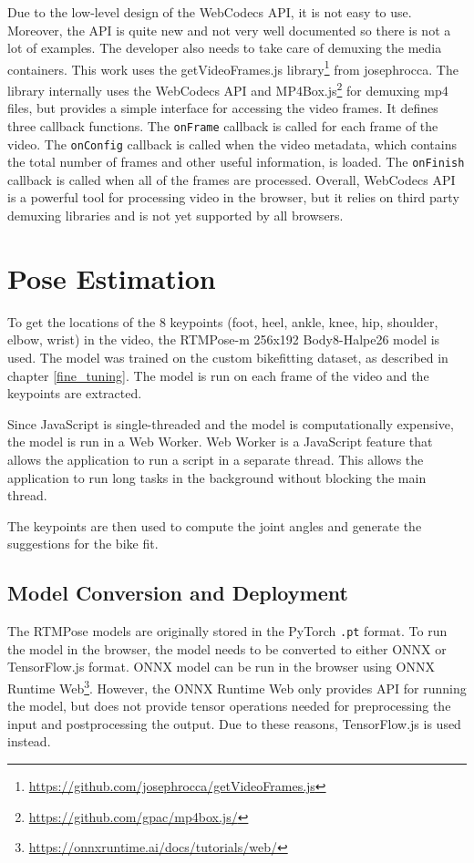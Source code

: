 Due to the low-level design of the WebCodecs API, it is not easy to use. Moreover, the API is quite new and not very well documented so there is not a lot of examples. The developer also needs to take care of demuxing the media containers. This work uses the getVideoFrames.js library\footnote{\url{https://github.com/josephrocca/getVideoFrames.js}} from josephrocca. The library internally uses the WebCodecs API and MP4Box.js\footnote{\url{https://github.com/gpac/mp4box.js/}} for demuxing mp4 files, but provides a simple interface for accessing the video frames.  It defines three callback functions. The \texttt{onFrame} callback is called for each frame of the video. The \texttt{onConfig} callback is called when the video metadata, which contains the total number of frames and other useful information, is loaded. The \texttt{onFinish} callback is called when all of the frames are processed. Overall, WebCodecs API is a powerful tool for processing video in the browser, but it relies on third party demuxing libraries and is not yet supported by all browsers.




\section{Pose Estimation}
\label{pose_estimation}
To get the locations of the 8 keypoints (foot, heel, ankle, knee, hip, shoulder, elbow, wrist) in the video, the RTMPose-m 256x192 Body8-Halpe26 model is used. The model was trained on the custom bikefitting dataset, as described in chapter \ref{fine_tuning}. The model is run on each frame of the video and the keypoints are extracted.

Since JavaScript is single-threaded and the model is computationally expensive, the model is run in a Web Worker. Web Worker is a JavaScript feature that allows the application to run a script in a separate thread. This allows the application to run long tasks in the background without blocking the main thread.

The keypoints are then used to compute the joint angles and generate the suggestions for the bike fit.
\subsection{Model Conversion and Deployment}
The RTMPose models are originally stored in the PyTorch \texttt{.pt} format. To run the model in the browser, the model needs to be converted to either ONNX or TensorFlow.js format. ONNX model can be run in the browser using ONNX Runtime Web\footnote{\url{https://onnxruntime.ai/docs/tutorials/web/}}. However, the ONNX Runtime Web only provides API for running the model, but does not provide tensor operations needed for preprocessing the input and postprocessing the output. Due to these reasons, TensorFlow.js is used instead.

